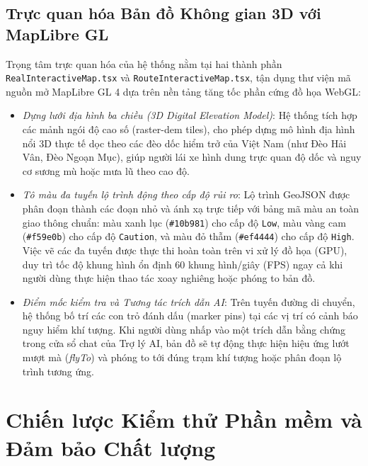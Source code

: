 \subsection{Trực quan hóa Bản đồ Không gian 3D với MapLibre GL}
Trọng tâm trực quan hóa của hệ thống nằm tại hai thành phần \texttt{RealInteractiveMap.tsx} và \texttt{RouteInteractiveMap.tsx}, tận dụng thư viện mã nguồn mở MapLibre GL 4 dựa trên nền tảng tăng tốc phần cứng đồ họa WebGL:
\begin{itemize}
    \item[-] \textit{Dựng lưới địa hình ba chiều (3D Digital Elevation Model)}: Hệ thống tích hợp các mảnh ngói độ cao số (raster-dem tiles), cho phép dựng mô hình địa hình nổi 3D thực tế dọc theo các đèo dốc hiểm trở của Việt Nam (như Đèo Hải Vân, Đèo Ngoạn Mục), giúp người lái xe hình dung trực quan độ dốc và nguy cơ sương mù hoặc mưa lũ theo cao độ.
    \item[-] \textit{Tô màu đa tuyến lộ trình động theo cấp độ rủi ro}: Lộ trình GeoJSON được phân đoạn thành các đoạn nhỏ và ánh xạ trực tiếp với bảng mã màu an toàn giao thông chuẩn: màu xanh lục (\texttt{\#10b981}) cho cấp độ \texttt{Low}, màu vàng cam (\texttt{\#f59e0b}) cho cấp độ \texttt{Caution}, và màu đỏ thẫm (\texttt{\#ef4444}) cho cấp độ \texttt{High}. Việc vẽ các đa tuyến được thực thi hoàn toàn trên vi xử lý đồ họa (GPU), duy trì tốc độ khung hình ổn định 60 khung hình/giây (FPS) ngay cả khi người dùng thực hiện thao tác xoay nghiêng hoặc phóng to bản đồ.
    \item[-] \textit{Điểm mốc kiểm tra và Tương tác trích dẫn AI}: Trên tuyến đường di chuyển, hệ thống bố trí các con trỏ đánh dấu (marker pins) tại các vị trí có cảnh báo nguy hiểm khí tượng. Khi người dùng nhấp vào một trích dẫn bằng chứng trong cửa sổ chat của Trợ lý AI, bản đồ sẽ tự động thực hiện hiệu ứng lướt mượt mà (\textit{flyTo}) và phóng to tới đúng trạm khí tượng hoặc phân đoạn lộ trình tương ứng.
\end{itemize}

\section{Chiến lược Kiểm thử Phần mềm và Đảm bảo Chất lượng}
\label{sec:testing_qa_strategy}

